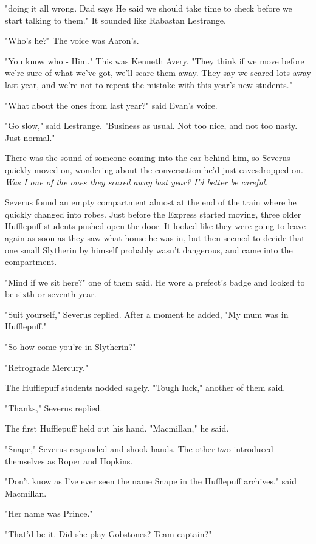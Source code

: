 "{\el}doing it all wrong. Dad says He said we should take time to check before we start talking to them." It sounded like Rabastan Lestrange.

"Who's he?" The voice was Aaron's.

"You know who - Him." This was Kenneth Avery. "They think if we move before we're sure of what we've got, we'll scare them away. They say we scared lots away last year, and we're not to repeat the mistake with this year's new students."

"What about the ones from last year?" said Evan's voice.

"Go slow," said Lestrange. "Business as usual. Not too nice, and not too nasty. Just normal."

There was the sound of someone coming into the car behind him, so Severus quickly moved on, wondering about the conversation he'd just eavesdropped on. \emph{Was I one of the ones they scared away last year? I'd better be careful.}

Severus found an empty compartment almost at the end of the train where he quickly changed into robes. Just before the Express started moving, three older Hufflepuff students pushed open the door. It looked like they were going to leave again as soon as they saw what house he was in, but then seemed to decide that one small Slytherin by himself probably wasn't dangerous, and came into the compartment.

"Mind if we sit here?" one of them said. He wore a prefect's badge and looked to be sixth or seventh year.

"Suit yourself," Severus replied. After a moment he added, "My mum was in Hufflepuff."

"So how come you're in Slytherin?"

"Retrograde Mercury."

The Hufflepuff students nodded sagely. "Tough luck," another of them said.

"Thanks," Severus replied.

The first Hufflepuff held out his hand. "Macmillan," he said.

"Snape," Severus responded and shook hands. The other two introduced themselves as Roper and Hopkins.

"Don't know as I've ever seen the name Snape in the Hufflepuff archives," said Macmillan.

"Her name was Prince."

"That'd be it. Did she play Gobstones? Team captain?"

